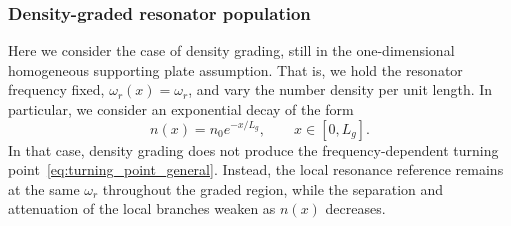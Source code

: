 
\subsubsection{Density-graded resonator population}\label{subsubsec:density_graded_resonators}
Here we consider the case of density grading, still in the one-dimensional homogeneous supporting plate assumption. That is, we hold the resonator frequency fixed, $\omega_r(x)=\omega_r$, and vary the number density per unit length. In particular, we consider an exponential decay of the form
\begin{equation}\label{eq:density_grade}
    n(x)=n_0 e^{-x/L_g},
    \qquad x\in[0,L_g].
\end{equation}
In that case, density grading does not produce the frequency-dependent turning point~\eqref{eq:turning_point_general}. Instead, the local resonance reference remains at the same $\omega_r$ throughout the graded region, while the separation and attenuation of the local branches weaken as $n(x)$ decreases.

